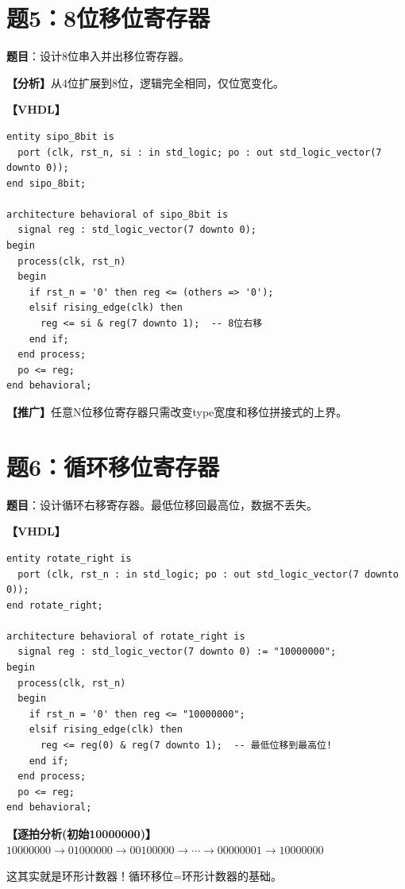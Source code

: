 \section{题5：8位移位寄存器}

\textbf{题目}：设计8位串入并出移位寄存器。

\begin{solution}[完整解答]

\textbf{【分析】}从4位扩展到8位，逻辑完全相同，仅位宽变化。

\textbf{【VHDL】}
\begin{lstlisting}
entity sipo_8bit is
  port (clk, rst_n, si : in std_logic; po : out std_logic_vector(7 downto 0));
end sipo_8bit;

architecture behavioral of sipo_8bit is
  signal reg : std_logic_vector(7 downto 0);
begin
  process(clk, rst_n)
  begin
    if rst_n = '0' then reg <= (others => '0');
    elsif rising_edge(clk) then
      reg <= si & reg(7 downto 1);  -- 8位右移
    end if;
  end process;
  po <= reg;
end behavioral;
\end{lstlisting}

\textbf{【推广】}任意N位移位寄存器只需改变type宽度和移位拼接式的上界。

\end{solution}


\section{题6：循环移位寄存器}

\textbf{题目}：设计循环右移寄存器。最低位移回最高位，数据不丢失。

\begin{solution}[完整解答]

\textbf{【VHDL】}
\begin{lstlisting}
entity rotate_right is
  port (clk, rst_n : in std_logic; po : out std_logic_vector(7 downto 0));
end rotate_right;

architecture behavioral of rotate_right is
  signal reg : std_logic_vector(7 downto 0) := "10000000";
begin
  process(clk, rst_n)
  begin
    if rst_n = '0' then reg <= "10000000";
    elsif rising_edge(clk) then
      reg <= reg(0) & reg(7 downto 1);  -- 最低位移到最高位!
    end if;
  end process;
  po <= reg;
end behavioral;
\end{lstlisting}

\textbf{【逐拍分析(初始10000000)】}
$10000000\to01000000\to00100000\to\cdots\to00000001\to10000000$

这其实就是环形计数器！循环移位=环形计数器的基础。

\end{solution}


